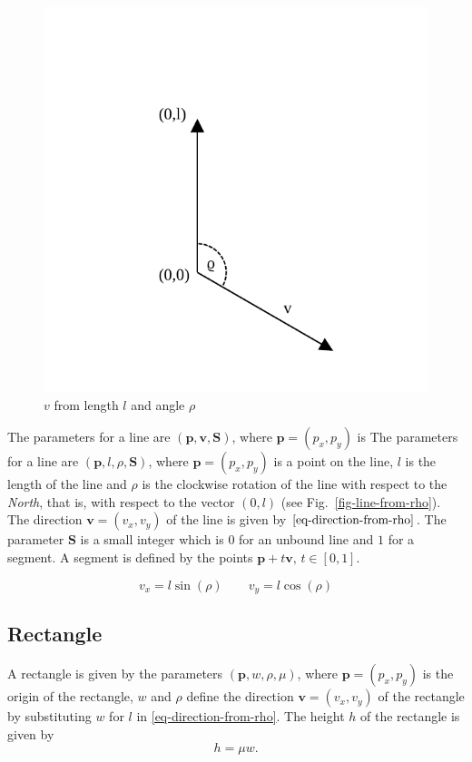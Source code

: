 \documentclass[11pt]{article}
\newcommand{\pb}{\mathbf{p}}
\newcommand{\Sb}{\mathbf{S}}
\newcommand{\vb}{\mathbf{v}}
\newcommand{\figref}[1]{Fig.~\eqref{#1}}
\begin{document}
\begin{figure}
    \centering
    \includegraphics[trim=0 20 0 80]{odg/line-from-angle.pdf}
    \caption{$v$ from length $l$ and angle $\rho$}\label{fig-line-from-rho}
\end{figure}
The parameters for a line are $(\pb, \vb, \Sb)$, where $\pb=(p_{x}, p_{y})$ is
The parameters for a line are $(\pb, l, \rho, \Sb)$, where $\pb=(p_{x}, p_{y})$ is
a point on the line, $l$ is the length of the line and $\rho$ is the clockwise rotation
of the line with respect to the \textsl{North}, that is, with respect to the
vector $(0, l)$ (see \figref{fig-line-from-rho}). The direction $\vb=(v_{x},
v_{y})$ of the line is given by $\eqref{eq-direction-from-rho}$. The
parameter $\Sb$ is a small integer which is $0$ for an unbound line and $1$
for a segment. A segment is defined by the points $\pb+t\vb,\,t\in[0,1]$.

\begin{equation}
    v_{x} = l\sin(\rho)\qquad v_{y} = l\cos(\rho) \label{eq-direction-from-rho}
\end{equation}
\subsection{Rectangle}
\label{sec-representation-rectangle}

A rectangle is given by the parameters $(\pb, w, \rho, \mu)$, where
$\pb=(p_{x}, p_{y})$ is the origin of the rectangle, $w$ and $\rho$ define the
direction $\vb=(v_{x}, v_{y})$ of the rectangle by substituting $w$ for $l$ in
\eqref{eq-direction-from-rho}. 
The height $h$ of the rectangle is given by
\begin{equation}
    h = \mu w.\label{eq-height-rectangle}
\end{equation}
\end{document}
